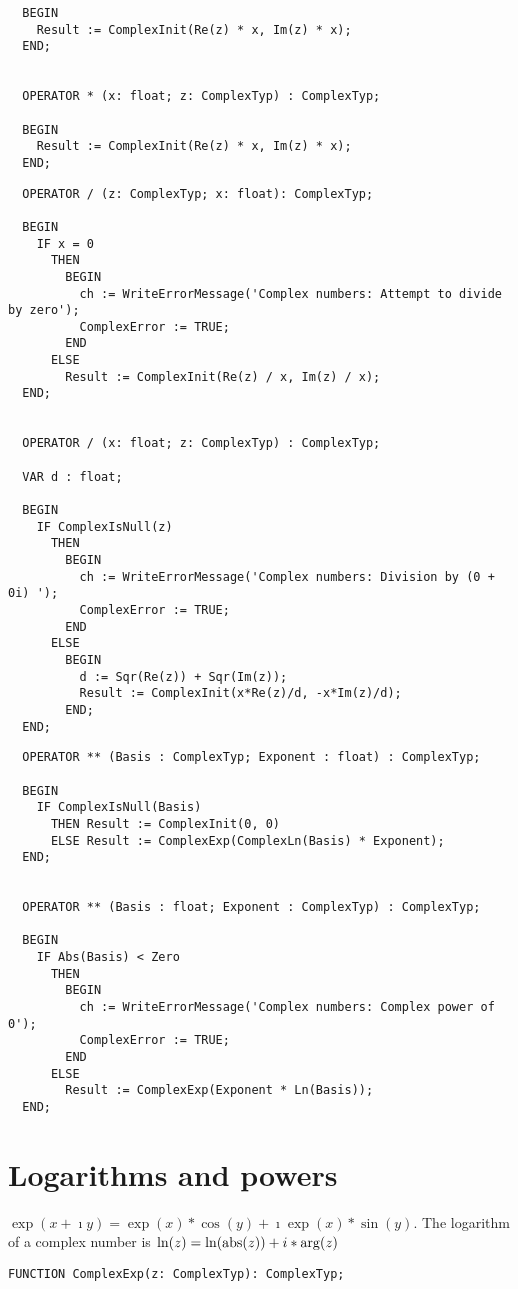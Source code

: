 \begin{refsection}
\begin{lstlisting}
  BEGIN
    Result := ComplexInit(Re(z) * x, Im(z) * x);
  END;


  OPERATOR * (x: float; z: ComplexTyp) : ComplexTyp;

  BEGIN
    Result := ComplexInit(Re(z) * x, Im(z) * x);
  END;
\end{lstlisting}

\begin{lstlisting}
  OPERATOR / (z: ComplexTyp; x: float): ComplexTyp;

  BEGIN
    IF x = 0
      THEN
        BEGIN
          ch := WriteErrorMessage('Complex numbers: Attempt to divide by zero');
          ComplexError := TRUE;
        END
      ELSE
        Result := ComplexInit(Re(z) / x, Im(z) / x);
  END;


  OPERATOR / (x: float; z: ComplexTyp) : ComplexTyp;

  VAR d : float;

  BEGIN
    IF ComplexIsNull(z)
      THEN
        BEGIN
          ch := WriteErrorMessage('Complex numbers: Division by (0 + 0i) ');
          ComplexError := TRUE;
        END
      ELSE
        BEGIN
          d := Sqr(Re(z)) + Sqr(Im(z));
          Result := ComplexInit(x*Re(z)/d, -x*Im(z)/d);
        END;
  END;
\end{lstlisting}

\begin{lstlisting}
  OPERATOR ** (Basis : ComplexTyp; Exponent : float) : ComplexTyp;

  BEGIN
    IF ComplexIsNull(Basis)
      THEN Result := ComplexInit(0, 0)
      ELSE Result := ComplexExp(ComplexLn(Basis) * Exponent);
  END;


  OPERATOR ** (Basis : float; Exponent : ComplexTyp) : ComplexTyp;

  BEGIN
    IF Abs(Basis) < Zero
      THEN
        BEGIN
          ch := WriteErrorMessage('Complex numbers: Complex power of 0');
          ComplexError := TRUE;
        END
      ELSE
        Result := ComplexExp(Exponent * Ln(Basis));
  END;
\end{lstlisting}


\section{Logarithms and powers}

\(\exp(x + \imath y) = \exp(x)*\cos(y) + \imath \exp(x)*\sin(y) \). The logarithm of a complex number is \(\ln(z) = \ln(\operatorname{abs}(z)) + i * \arg(z) \)

\begin{lstlisting}[caption=Logarithm and exponential function]
  FUNCTION ComplexExp(z: ComplexTyp): ComplexTyp;


\end{lstlisting}
\end{refsection}
